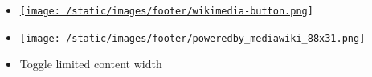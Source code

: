 \documentclass[
]{article}
\providecommand{\tightlist}{%
  \setlength{\itemsep}{0pt}\setlength{\parskip}{0pt}}
\begin{document}
\begin{itemize}
\tightlist
\item
  \label{footer-copyrightico}{\href{https://wikimediafoundation.org/}{\texttt{[image: /static/images/footer/wikimedia-button.png]}}}
\item
  \label{footer-poweredbyico}{\href{https://www.mediawiki.org/}{\texttt{[image: /static/images/footer/poweredby\_mediawiki\_88x31.png]}}}
\end{itemize}

\label{p-dock-bottom}
\begin{itemize}
\tightlist
\item
  {} {Toggle limited content width}
\end{itemize}
\end{document}
